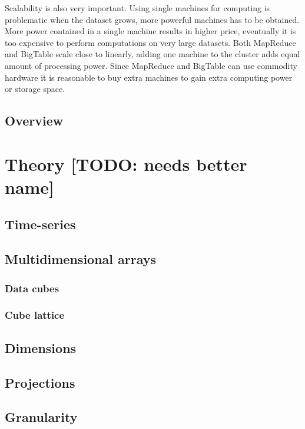 \documentclass[a4paper,10pt]{book}
\begin{document}
Scalability is also very important. Using single machines for computing is
problematic when the dataset grows, more powerful machines has to be
obtained. More power contained in a single machine results in higher price,
eventually it is too expensive to perform computations on very large
datasets. Both MapReduce and BigTable scale close to linearly, adding one
machine to the cluster adds equal amount of processing power. Since
MapReduce and BigTable can use commodity hardware it is reasonable to buy
extra machines to gain extra computing power or storage space.


\section{Overview}



\chapter{Theory [TODO: needs better name]}

\section{Time-series}

\section{Multidimensional arrays}

\subsection{Data cubes}

\subsection{Cube lattice}

\section{Dimensions}

\section{Projections}

\section{Granularity}
\end{document}

